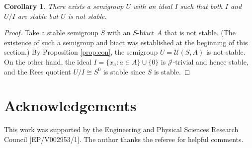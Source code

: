 \documentclass[twoside,a4paper,12pt,reqno]{amsart}
\theoremstyle{plain}
\newtheorem{cor}[thm]{Corollary}
\theoremstyle{definition}
\renewcommand{\j}{\mbox{${\mathcal{J}}$}}
\renewcommand{\th}{\theta}
\newcommand{\U}{\mathcal{U}}
\renewcommand{\th}{\theta}
\begin{document}
\begin{cor}
There exists a semigroup $U$ with an ideal $I$ such that both $I$ and $U/I$ are stable but $U$ is not stable.
\end{cor}

\begin{proof}
Take a stable semigroup $S$ with an $S$-biact $A$ that is not stable.  (The existence of such a semigroup and biact was established at the beginning of this section.)
By Proposition \ref{prop:con}, the semigroup $U=\U(S,A)$ is not stable.  On the other hand, the ideal $I=\{x_a : a\in A\}\cup\{0\}$ is $\j$-trivial and hence stable, and the Rees quotient $U/I\cong S^0$ is stable since $S$ is stable.
\end{proof}

\vspace{0.5em}
\section*{Acknowledgements}
This work was supported by the Engineering and Physical Sciences Research Council [EP/V002953/1].  The author thanks the referee for helpful comments.
\end{document}
